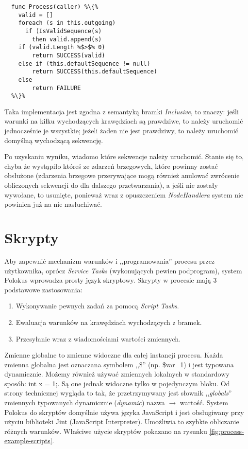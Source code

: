 \documentclass[declaration,shortabstract,mgr]{iithesis}
\newcommand{\typicalVerticalSpace}{\setlength\itemsep{0em}}
\begin{document}
\begin{minipage}[c]{\textwidth}
\centering
\begin{lstlisting}
  func Process(caller) %\{%
    valid = []
    foreach (s in this.outgoing)
      if (IsValidSequence(s)
        then valid.append(s)
    if (valid.Length %$>$% 0)
        return SUCCESS(valid)
    else if (this.defaultSequence != null)
        return SUCCESS(this.defaultSequence)
    else
        return FAILURE  
  %\}%
\end{lstlisting}
\end{minipage}

Taka implementacja jest zgodna z semantyką bramki \textit{Inclusive}, to znaczy: jeśli warunki na kilku wychodzących krawędziach są prawdziwe, to należy uruchomić jednocześnie je wszystkie; jeżeli żaden nie jest prawdziwy, to należy uruchomić domyślną wychodzącą sekwencję.

Po uzyskaniu wyniku, wiadomo które sekwencje należy uruchomić. Stanie się to, chyba że wystąpiło któreś ze zdarzeń brzegowych, które powinny zostać obsłużone (zdarzenia brzegowe przerywające mogą również anulować zwrócenie obliczonych sekwencji do dla dalszego przetwarzania), a jeśli nie zostały wywołane, to usunięte, ponieważ wraz z opuszczeniem \textit{NodeHandlera} system nie powinien już na nie nasłuchiwać.


\section{Skrypty}
Aby zapewnić mechanizm warunków i ,,programowania'' procesu przez użytkownika, oprócz \textit{Service Tasks} (wykonujących pewien podprogram), system Polokus wprowadza prosty język skryptowy. Skrypty w procesie mają 3 podstawowe zastosowania:
\begin{enumerate}
    \typicalVerticalSpace
    \item Wykonywanie pewnych zadań za pomocą \textit{Script Tasks}.
    \item Ewaluacja warunków na krawędziach wychodzących z bramek.
    \item Przesyłanie wraz z wiadomościami wartości zmiennych.
\end{enumerate}

Zmienne globalne to zmienne widoczne dla całej instancji procesu. Każda zmienna globalna jest oznaczana symbolem ,,\$'' (np. \$var\_1) i jest typowana dynamicznie. Możemy również używać zmiennych lokalnych w standardowy sposób: int x = 1;. Są one jednak widoczne tylko w pojedynczym bloku. Od strony technicznej wygląda to tak, że przetrzymywany jest słownik ,,\textit{globals}'' zmiennych typowanych dynamicznie (\textit{dynamic}) nazwa $\rightarrow$ wartość. System Polokus do skryptów domyślnie używa języka JavaScript i jest obsługiwany przy użyciu biblioteki Jint (JavaScript Interpreter). Umożliwia to szybkie obliczanie różnych warunków. Właściwe użycie skryptów pokazano na rysunku \ref{fig:process-example-scripts}.
\end{document}
